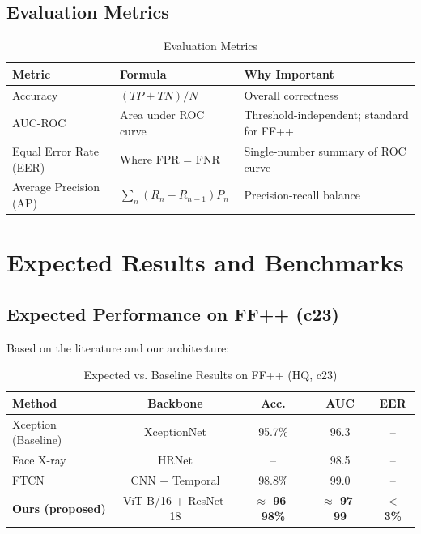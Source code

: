 \documentclass[12pt,a4paper]{article}
\begin{document}
\subsection{Evaluation Metrics}

\begin{table}[h]
\centering
\caption{Evaluation Metrics}
\begin{tabular}{lll}
\toprule
\textbf{Metric} & \textbf{Formula} & \textbf{Why Important} \\
\midrule
Accuracy & $(TP + TN) / N$ & Overall correctness \\
AUC-ROC & Area under ROC curve & Threshold-independent; standard for FF++ \\
Equal Error Rate (EER) & Where FPR = FNR & Single-number summary of ROC curve \\
Average Precision (AP) & $\sum_n (R_n - R_{n-1}) P_n$ & Precision-recall balance \\
\bottomrule
\end{tabular}
\end{table}

\newpage

\section{Expected Results and Benchmarks}

\subsection{Expected Performance on FF++ (c23)}

Based on the literature and our architecture:

\begin{table}[h]
\centering
\caption{Expected vs. Baseline Results on FF++ (HQ, c23)}
\begin{tabular}{lcccc}
\toprule
\textbf{Method} & \textbf{Backbone} & \textbf{Acc.} & \textbf{AUC} & \textbf{EER} \\
\midrule
Xception (Baseline)      & XceptionNet    & 95.7\% & 96.3 & -- \\
Face X-ray               & HRNet          & --     & 98.5 & -- \\
FTCN                     & CNN + Temporal & 98.8\% & 99.0 & -- \\
\textbf{Ours (proposed)} & ViT-B/16 + ResNet-18 & \textbf{$\approx$ 96--98\%} & \textbf{$\approx$ 97--99} & \textbf{$<$3\%} \\
\bottomrule
\end{tabular}
\end{table}
\end{document}
